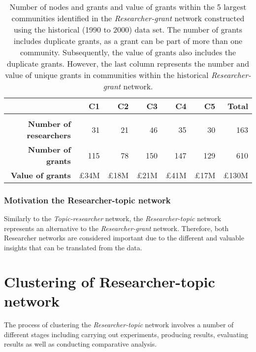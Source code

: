 \begin{table}[!htbp]
\centering
\caption[Number of nodes and grants and value of grants within the 5 largest communities in the \textit{Researcher-grant} network constructed using the historical (1990 to 2000) data set]{Number of nodes and grants and value of grants within the 5 largest communities identified in the \textit{Researcher-grant} network constructed using the historical (1990 to 2000) data set. The number of grants includes duplicate grants, as a grant can be part of more than one community. Subsequently, the value of grants also includes the duplicate grants. However, the last column represents the number and value of unique grants in communities within the historical \textit{Researcher-grant} network.}
\label{table:researcher_b_past2_numbers}
\begin{tabular}{r|rrrrrr}
{} & \textbf{C1} & \textbf{C2} & \textbf{C3} & \textbf{C4} & \textbf{C5} & \textbf{Total}\\
\hline\\
\textbf{Number of researchers} & {31}  & {21} & {46}  & {35}  & {30}  & {163}\\
\textbf{Number of grants}      & {115} & {78} & {150} & {147} & {129} & {610}\\
\textbf{Value of grants} & {\pounds34M} & {\pounds18M} & {\pounds21M} & {\pounds41M} & {\pounds17M} & {\pounds130M}
\end{tabular}
\end{table}

\subsubsection{Motivation the Researcher-topic network}

Similarly to the \textit{Topic-researcher} network, the \textit{Researcher-topic} network represents an alternative to the \textit{Researcher-grant} network. Therefore, both Researcher networks are considered important due to the different and valuable insights that can be translated from the data.

\clearpage

\section{Clustering of Researcher-topic network}

The process of clustering the \textit{Researcher-topic} network involves a number of different stages including carrying out experiments, producing results, evaluating results as well as conducting comparative analysis.


